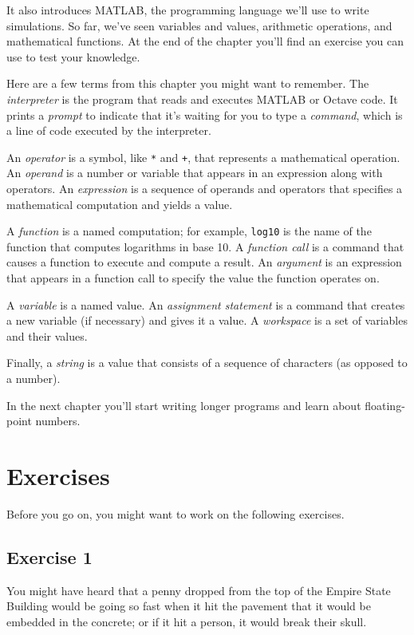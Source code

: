 It also introduces MATLAB, the programming language we'll use to write simulations.  So far, we've seen variables and values, arithmetic operations, and mathematical functions.  At the end of the chapter you'll find an exercise you can use to test your knowledge.

Here are a few terms from this chapter you might want to remember.
The {\em interpreter} is the program that reads and executes MATLAB or Octave code.
It prints a {\em prompt} to indicate that it's waiting for you to type a {\em command}, which is a line of code executed by the interpreter.

An {\em operator} is a symbol, like \lstinline{*} and \lstinline{+}, that
represents a mathematical operation.
An {\em operand} is a number or variable that appears in an expression along
with operators.
An {\em expression} is a sequence of operands and operators that specifies
a mathematical computation and yields a value.

A {\em function} is a named computation; for example, \lstinline{log10} is the
name of the function that computes logarithms in base 10.
A {\em function call} is a command that causes a function to execute and compute a result.
An {\em argument} is an expression that appears in a function call to
specify the value the function operates on.

A {\em variable} is a named value. An {\em assignment statement} is a command that creates a new variable (if necessary) and gives it a value.
A {\em workspace} is a set of variables and their values.

Finally, a {\em string} is a value that consists of a sequence of characters (as opposed to a number).

In the next chapter you'll start writing longer programs and learn about floating-point numbers.

\section{Exercises}

Before you go on, you might want to work on the following exercises.

\subsection{Exercise 1}
\label{penny}
You might have heard that a penny dropped from the top of the Empire State Building would be going so fast when it hit the pavement that it would be embedded in the concrete; or if it hit a person, it would break their skull.


